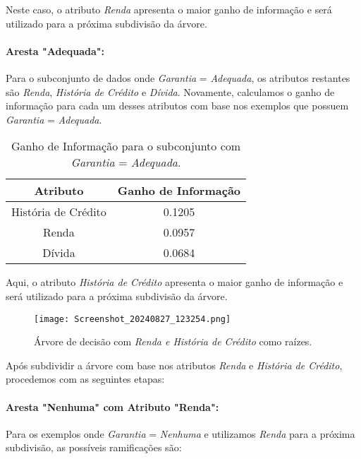 \documentclass[a4paper,12pt]{article}
\begin{document}
Neste caso, o atributo \textit{Renda} apresenta o maior ganho de informação e será utilizado para a próxima subdivisão da árvore.

\paragraph{Aresta "Adequada":}
Para o subconjunto de dados onde \textit{Garantia} = \textit{Adequada}, os atributos restantes são \textit{Renda}, \textit{História de Crédito} e \textit{Dívida}. Novamente, calculamos o ganho de informação para cada um desses atributos com base nos exemplos que possuem \textit{Garantia} = \textit{Adequada}.

\begin{table}[H]
\centering
\begin{tabular}{|c|c|}
\hline
\textbf{Atributo} & \textbf{Ganho de Informação} \\
\hline
História de Crédito & 0.1205 \\
\hline
Renda & 0.0957 \\
\hline
Dívida & 0.0684 \\
\hline
\end{tabular}
\caption{Ganho de Informação para o subconjunto com \textit{Garantia} = \textit{Adequada}.}
\label{tab:ganho-informacao-adequada}
\end{table}

Aqui, o atributo \textit{História de Crédito} apresenta o maior ganho de informação e será utilizado para a próxima subdivisão da árvore.

\begin{figure}[H]
    \centering
    \texttt{[image: Screenshot\_20240827\_123254.png]} %
    \caption{Árvore de decisão com \textit{Renda e História de Crédito} como raízes.}
    \label{fig:arvore-renda-historia}
\end{figure}


Após subdividir a árvore com base nos atributos \textit{Renda} e \textit{História de Crédito}, procedemos com as seguintes etapas:

\paragraph{Aresta "Nenhuma" com Atributo "Renda":}
Para os exemplos onde \textit{Garantia} = \textit{Nenhuma} e utilizamos \textit{Renda} para a próxima subdivisão, as possíveis ramificações são:
\end{document}
